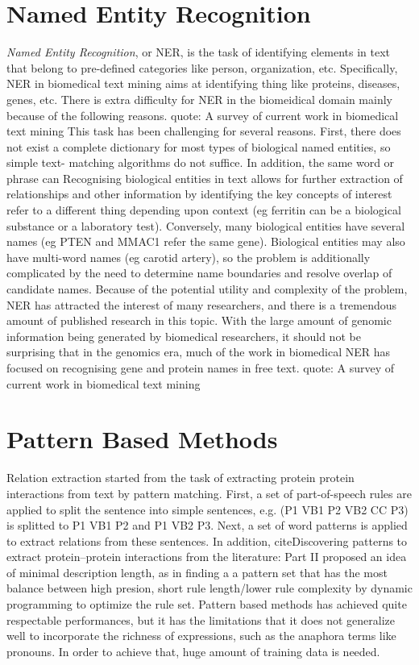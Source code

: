 \section{Named Entity Recognition}
\emph{Named Entity Recognition}, or NER, is the task of identifying elements in text that belong to pre-defined categories like person, organization, etc. Specifically, NER in biomedical text mining aims at identifying thing like proteins, diseases, genes, etc. There is extra difficulty for NER in the biomeidical domain mainly because of the following reasons. 
quote: A survey of current work in biomedical text mining
This task has been challenging for several reasons. First, there does not exist a complete dictionary for most types of biological named entities, so simple text- matching algorithms do not suffice. In addition, the same word or phrase can
Recognising biological entities in text allows for further extraction of relationships and other information by identifying the key concepts of interest
refer to a different thing depending upon context (eg ferritin can be a biological substance or a laboratory test). Conversely, many biological entities have several names (eg PTEN and MMAC1 refer the same gene). Biological entities may also have multi-word names (eg carotid artery), so the problem is additionally complicated by the need to determine name boundaries and resolve overlap of candidate names.
Because of the potential utility and complexity of the problem, NER has attracted the interest of many researchers, and there is a tremendous amount of published research in this topic. With the large amount of genomic information being generated by biomedical researchers, it should not be surprising that in the genomics era, much of the work in biomedical NER has focused on recognising gene and protein names in free text.
quote: A survey of current work in biomedical text mining
\section{Pattern Based Methods}
Relation extraction started from the task of extracting protein protein interactions from text by pattern matching. 
First, a set of part-of-speech rules are applied to split the sentence into simple sentences, e.g. (P1 VB1 P2 VB2 CC P3) is splitted to P1 VB1 P2 and P1 VB2 P3. Next, a set of word patterns is applied to extract relations from these sentences. In addition, cite{Discovering patterns to extract protein–protein interactions
from the literature: Part II} proposed an idea of minimal description length, as in finding a a pattern set that has the most balance between high presion, short rule length/lower rule complexity by dynamic programming to optimize the rule set.  Pattern based methods has achieved quite respectable performances, but it has the limitations that it does not generalize well to incorporate the richness of expressions, such as the anaphora terms like pronouns. In order to achieve that, huge amount of training data is needed. 
